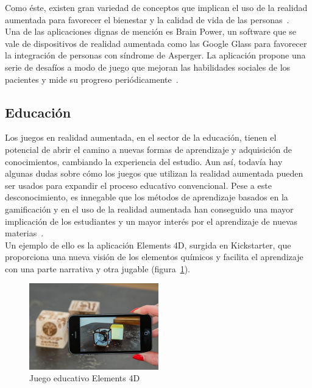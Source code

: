 Como éste, existen gran variedad de conceptos que implican el uso de la realidad aumentada para favorecer el bienestar y la calidad de vida de las personas~\cite{ARGames_Gamification}.\\
Una de las aplicaciones dignas de mención es Brain Power, un software que se vale de dispositivos de realidad aumentada como las Google Glass para favorecer la integración de personas con síndrome de Asperger. La aplicación propone una serie de desafíos a modo de juego que mejoran las habilidades sociales de los pacientes y mide su progreso periódicamente~\cite{RealAumento}.

\subsection{Educación}
Los juegos en realidad aumentada, en el sector de la educación, tienen el potencial de abrir el camino a nuevas formas de aprendizaje y adquisición de conocimientos, cambiando la experiencia del estudio. Aun así, todavía hay algunas dudas sobre cómo los juegos que utilizan la realidad aumentada pueden ser usados para expandir el proceso educativo convencional. Pese a este desconocimiento, es innegable que los métodos de aprendizaje basados en la gamificación y en el uso de la realidad aumentada han conseguido una mayor implicación de los estudiantes y un mayor interés por el aprendizaje de nuevas materias~\cite{ARGames_Gamification}.\\

Un ejemplo de ello es la aplicación Elements 4D, surgida en Kickstarter, que proporciona una nueva visión de los elementos químicos y facilita el aprendizaje con una parte narrativa y otra jugable (figura~\ref{fig:Elemets}).\\

\begin{figure}[H]
     \centering
     \includegraphics[width=0.5\textwidth]{Images/Figura-3-Elements-4D.png}
     \caption[Juego educativo Elements 4D]{Juego educativo Elements 4D\footnotemark}
     \label{fig:Elemets}
 \end{figure}
 
